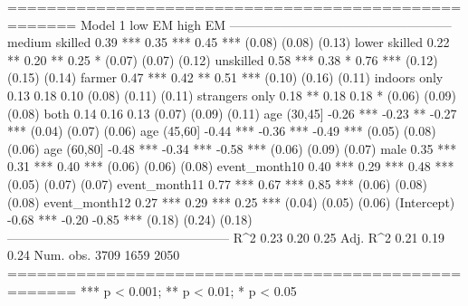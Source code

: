 
=====================================================
                Model 1      low EM       high EM    
-----------------------------------------------------
medium skilled     0.39 ***     0.35 ***     0.45 ***
                  (0.08)       (0.08)       (0.13)   
lower skilled      0.22 **      0.20 **      0.25 *  
                  (0.07)       (0.07)       (0.12)   
unskilled          0.58 ***     0.38 *       0.76 ***
                  (0.12)       (0.15)       (0.14)   
farmer             0.47 ***     0.42 **      0.51 ***
                  (0.10)       (0.16)       (0.11)   
indoors only       0.13         0.18         0.10    
                  (0.08)       (0.11)       (0.11)   
strangers only     0.18 **      0.18         0.18 *  
                  (0.06)       (0.09)       (0.08)   
both               0.14         0.16         0.13    
                  (0.07)       (0.09)       (0.11)   
age (30,45]       -0.26 ***    -0.23 **     -0.27 ***
                  (0.04)       (0.07)       (0.06)   
age (45,60]       -0.44 ***    -0.36 ***    -0.49 ***
                  (0.05)       (0.08)       (0.06)   
age (60,80]       -0.48 ***    -0.34 ***    -0.58 ***
                  (0.06)       (0.09)       (0.07)   
male               0.35 ***     0.31 ***     0.40 ***
                  (0.06)       (0.06)       (0.08)   
event_month10      0.40 ***     0.29 ***     0.48 ***
                  (0.05)       (0.07)       (0.07)   
event_month11      0.77 ***     0.67 ***     0.85 ***
                  (0.06)       (0.08)       (0.08)   
event_month12      0.27 ***     0.29 ***     0.25 ***
                  (0.04)       (0.05)       (0.06)   
(Intercept)       -0.68 ***    -0.20        -0.85 ***
                  (0.18)       (0.24)       (0.18)   
-----------------------------------------------------
R^2                0.23         0.20         0.25    
Adj. R^2           0.21         0.19         0.24    
Num. obs.       3709         1659         2050       
=====================================================
*** p < 0.001; ** p < 0.01; * p < 0.05
